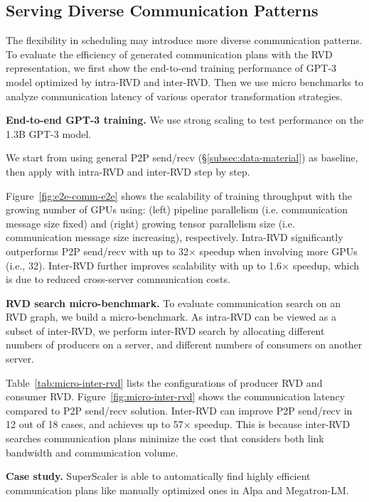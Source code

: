 \subsection{Serving Diverse Communication Patterns}
\label{sec:eval-comm}

The flexibility in scheduling may introduce more diverse communication patterns. To evaluate the efficiency of generated communication plans with the RVD representation, we first show the end-to-end training performance of GPT-3 model optimized by intra-RVD and inter-RVD. Then we use micro benchmarks to analyze communication latency of various operator transformation strategies.

{\bf  End-to-end GPT-3 training. } We use strong scaling to test performance on the 1.3B GPT-3 model.

We start from using general P2P send/recv (\S\ref{subsec:data-material}) as baseline, then apply with intra-RVD and inter-RVD step by step.

Figure~\ref{fig:e2e-comm-e2e} shows the scalability of training throughput with the growing number of GPUs using: (left) pipeline parallelism (i.e. communication message size fixed) and (right) growing tensor parallelism size (i.e. communication message size increasing), respectively. Intra-RVD significantly outperforms P2P send/recv with up to 32$\times$ speedup when involving more GPUs (i.e., 32). Inter-RVD further improves scalability with up to 1.6$\times$ speedup, which is due to reduced cross-server communication costs.

{\bf  RVD search micro-benchmark. } To evaluate communication search on an RVD graph, we build a micro-benchmark. As intra-RVD can be viewed as a subset of inter-RVD, we perform inter-RVD search by allocating different numbers of producers on a server, and different numbers of consumers on another server.

Table~\ref{tab:micro-inter-rvd} lists the configurations of producer RVD and consumer RVD. Figure~\ref{fig:micro-inter-rvd} shows the communication latency compared to P2P send/recv solution. Inter-RVD can improve P2P send/recv in 12 out of 18 cases, and achieves up to 57$\times$ speedup. This is because inter-RVD searches communication plans minimize the cost that considers both link bandwidth and communication volume.

{\bf  Case study. } {SuperScaler} is able to automatically find highly efficient communication plans like manually optimized ones in Alpa and Megatron-LM. 

